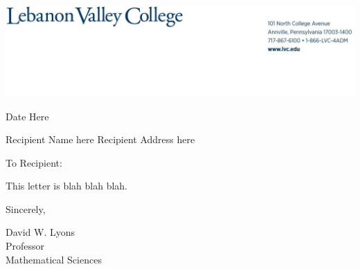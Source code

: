 \documentclass[12pt]{article}
\newcommand{\spacer}{\rule[0cm]{0cm}{0cm}}
\begin{document}
\spacer\hspace*{-0.4in}\includegraphics[width=6.5in]{lvc_letterhead_graphic.jpg}

\spacer\vspace*{-.75in}
\begin{flushright}
Date Here
\end{flushright}

\newcommand{\recip}{
Recipient Name here
Recipient Address here
}
\recip

\vspace*{.3in}

To Recipient:

\vspace*{.15in}

This letter is blah blah blah.


\vspace*{.15in}

Sincerely,

\vspace*{.4in}

David W. Lyons\\
Professor\\
Mathematical Sciences
\end{document}
